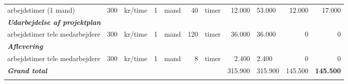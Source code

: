 \documentclass[11pt,a4paper]{article}
\begin{document}
\begin{table}[htbp]
\begin{tabular}{lrlrlrlrlrr}
arbejdstimer (1 mand) & 300   & kr/time & 1     & mand  & 40    & timer & 12.000 & 53.000 & 12.000 & 17.000\\
\multicolumn{11}{l}{\textit{\textbf{Udarbejdelse af projektplan}}}\\
arbejdstimer tele medarbejdere & 300   & kr/time & 1     & mand  & 120   & timer & 36.000 & 36.000 & 0     & 0\\
\multicolumn{11}{l}{\textit{\textbf{Aflevering}}}\\
arbejdstimer tele medarbejdere & 300   & kr/time & 1     & mand  & 8     & timer & 2.400 & 2.400 & 0     & 0\\
\hline
\multicolumn{7}{l}{\textit{\textbf{Grand total}}} & 315.900 & 315.900 & 145.500 & \textbf{145.500}\\
\hline\\
\end{tabular}%
\label{tab:addlabel}%
\end{table}%
\end{document}
